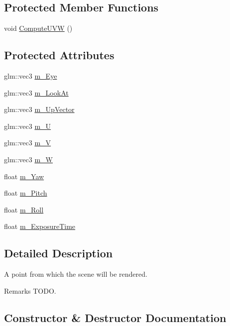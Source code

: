 \subsection*{Protected Member Functions}
\begin{DoxyCompactItemize}
\item 
void \hyperlink{class_camera_ab2a27d88b13f4cab92d62bc421650e7b}{Compute\+U\+VW} ()
\end{DoxyCompactItemize}
\subsection*{Protected Attributes}
\begin{DoxyCompactItemize}
\item 
glm\+::vec3 \hyperlink{class_camera_afea4cf59abeabef0ac61915bccd1c35c}{m\+\_\+\+Eye}
\item 
glm\+::vec3 \hyperlink{class_camera_a64c0c57201219d5e9965298a19007a61}{m\+\_\+\+Look\+At}
\item 
glm\+::vec3 \hyperlink{class_camera_ae48ab25a4c2c9a91e6814db0c1abe72c}{m\+\_\+\+Up\+Vector}
\item 
glm\+::vec3 \hyperlink{class_camera_a544f5de8d6c0b2d9aea1a9cff9f0aeb6}{m\+\_\+U}
\item 
glm\+::vec3 \hyperlink{class_camera_a2bfb4e67db9d92f152913c8cb8159797}{m\+\_\+V}
\item 
glm\+::vec3 \hyperlink{class_camera_a75de71e6e4b12d69d46d84d04f37c7c3}{m\+\_\+W}
\item 
float \hyperlink{class_camera_ac3b7d101ef808536cac0f679deef5f9c}{m\+\_\+\+Yaw}
\item 
float \hyperlink{class_camera_aac745762c9d82b5cdfdcd48c7902b919}{m\+\_\+\+Pitch}
\item 
float \hyperlink{class_camera_a58eab74ebcfe6a72ae0d6df32a102181}{m\+\_\+\+Roll}
\item 
float \hyperlink{class_camera_a9930c812c2015bf0f3746c18ff2d3e3b}{m\+\_\+\+Exposure\+Time}
\end{DoxyCompactItemize}


\subsection{Detailed Description}
A point from which the scene will be rendered. \begin{DoxyRemark}{Remarks}
T\+O\+DO. 
\end{DoxyRemark}


\subsection{Constructor \& Destructor Documentation}
\hypertarget{class_camera_a01f94c3543f56ede7af49dc778f19331}{}\label{class_camera_a01f94c3543f56ede7af49dc778f19331} 
